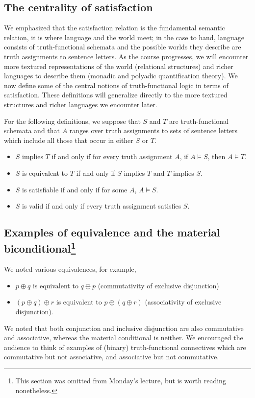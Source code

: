 \subsection{The centrality of satisfaction}

We emphasized that the satisfaction relation is the fundamental semantic relation, it is where language and the world meet; in the case to hand, language consists of truth-functional schemata and the possible worlds they describe are truth assignments to sentence letters. As the course progresses, we will encounter more textured representations of the world (relational structures) and richer languages to describe them (monadic and polyadic quantification theory). We now define some of the central notions of truth-functional logic in terms of satisfaction. These definitions will generalize directly to the more textured structures and richer languages we encounter later. 
\begin{definition}\label{tf-eq-sat-val-def}
For the following definitions, we suppose that $S$ and $T$ are truth-functional schemata and that $A$ ranges over truth assignments to sets of sentence letters which include all those that occur in either $S$ or $T$.
\begin{itemize}
\item $S$ implies $T$ if and only if for every truth assignment $A$, if $A\models S$, then $A\models T$.
\item $S$ is equivalent to $T$ if and only if $S$ implies $T$ and $T$ implies $S$.
\item $S$ is satisfiable if and only if for some $A$, $A\models S$.
\item $S$ is valid if and only if every truth assignment satisfies $S$. 
\end{itemize}
\end{definition}
\subsection[Examples of equivalence and the material biconditional]{Examples of equivalence and the material biconditional\footnote{This section was omitted from Monday's lecture, but is worth reading nonetheless.}}

We noted various equivalences, for example,  
\begin{itemize}
\item $p\oplus q$ is equivalent to $q\oplus p$ (commutativity of exclusive disjunction)  
\item $(p\oplus q)\oplus r$ is equivalent to $p\oplus(q\oplus r)$ (associativity of exclusive disjunction).
\end{itemize}
We noted that both conjunction and inclusive disjunction are also commutative and associative, whereas the material conditional is neither. We encouraged the audience to think of examples of (binary) truth-functional connectives which are commutative but not associative, and associative but not commutative.
   
